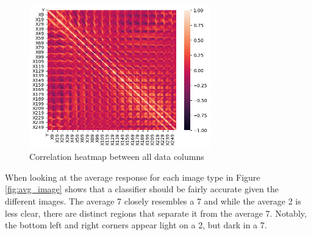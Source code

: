 \documentclass[12pt,letterpaper]{article}
\begin{document}
\begin{figure}[h]
  \centering
  \includegraphics[width=0.7\textwidth]{heatmap}
  \caption{Correlation heatmap between all data columns}
  \label{fig:heatmap}
\end{figure}

When looking at the average response for each image type in Figure \ref{fig:avg_image} shows that a classifier should be fairly accurate given the different images. The average 7 closely resembles a 7 and while the average 2 is less clear, there are distinct regions that separate it from the average 7. Notably, the bottom left and right corners appear light on a 2, but dark in a 7.
\end{document}
